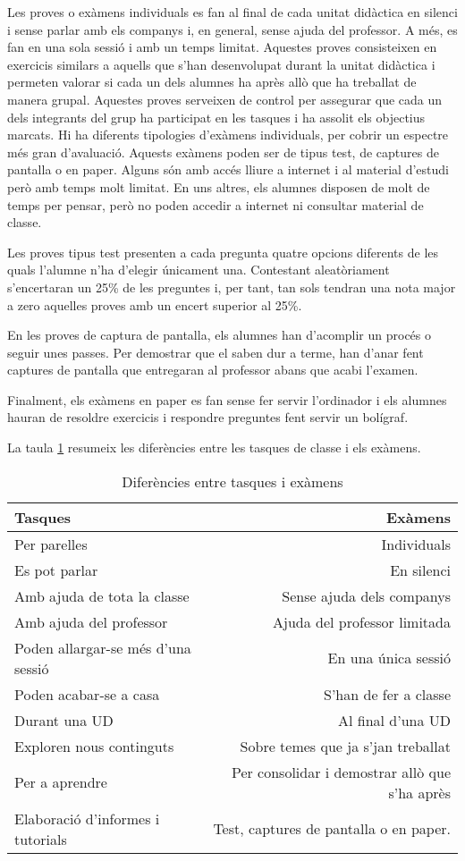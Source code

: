 \documentclass[catalan, a4paper, 12pt, titlepage]{article}
\begin{document}
Les proves o exàmens individuals es fan al final de cada unitat didàctica en silenci i sense parlar amb els companys i, en general, sense ajuda del professor.
A més, es fan en una sola sessió i amb un temps limitat.
Aquestes proves consisteixen en exercicis similars a aquells que s'han desenvolupat durant la unitat didàctica i permeten valorar si cada un dels alumnes ha après allò que ha treballat de manera grupal.
Aquestes proves serveixen de control per assegurar que cada un dels integrants del grup ha participat en les tasques i ha assolit els objectius marcats.
Hi ha diferents tipologies d'exàmens individuals, per cobrir un espectre més gran d'avaluació. Aquests exàmens poden ser de tipus test, de captures de pantalla o en paper. 
Alguns són amb accés lliure a internet i al material d'estudi però amb temps molt limitat.
En uns altres, els alumnes disposen de molt de temps per pensar, però no poden accedir a internet ni consultar material de classe.

Les proves tipus test presenten a cada pregunta quatre opcions diferents de les quals l'alumne n'ha d'elegir únicament una.
Contestant aleatòriament s'encertaran un 25\% de les preguntes i, per tant, tan sols tendran una nota major a zero aquelles proves amb un encert superior al 25\%.

En les proves de captura de pantalla, els alumnes han d'acomplir un procés o seguir unes passes.
Per demostrar que el saben dur a terme, han d'anar fent captures de pantalla que entregaran al professor abans que acabi l'examen.

Finalment, els exàmens en paper es fan sense fer servir l'ordinador i els alumnes hauran de resoldre exercicis i respondre preguntes fent servir un bolígraf.

La taula \ref{tab:tasquesiexamens} resumeix les diferències entre les tasques de classe i els exàmens.

\begin{table}
	\small
        \centering
        \begin{tabular}{lr}
        Tasques & Exàmens\\
        \hline
	Per parelles & Individuals\\
		Es pot parlar & En silenci \\
		Amb ajuda de tota la classe &Sense ajuda dels companys\\
		Amb ajuda del professor & Ajuda del professor limitada\\
		Poden allargar-se més d'una sessió & En una única sessió\\
		Poden acabar-se a casa & S'han de fer a classe\\
		Durant una UD & Al final d'una UD \\
		Exploren nous continguts & Sobre temes que ja s'jan treballat\\
		Per a aprendre & Per consolidar i demostrar allò que s'ha après\\
		Elaboració d'informes i tutorials & Test, captures de pantalla o en paper.

\end{tabular}
        \caption{Diferències entre tasques i exàmens} \label{tab:tasquesiexamens}
\end{table}
\end{document}
